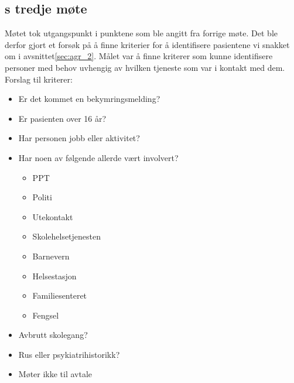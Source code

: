 \documentclass[11pt]{report} %
\begin{document}
                  \subsection{s tredje møte}\label{sec:agr_3}
                    Møtet tok utgangspunkt i punktene som ble angitt fra forrige møte\cite{arbgr_mref-2}. Det ble derfor gjort et forsøk på å finne kriterier for å identifisere pasientene vi snakket om i avsnittet\ref{sec:agr_2}. Målet var å finne kriterer som kunne identifisere personer med behov uvhengig av hvilken tjeneste som var i kontakt med dem. \\
                    Forslag til kriterer:\\
                      \begin{itemize}
                        \item Er det kommet en bekymringsmelding?\\
                        \item Er pasienten over 16 år?\\
                        \item Har personen jobb eller aktivitet?\\
                        \item Har noen av følgende allerde vært involvert?
                          \begin{itemize}
                            \item PPT\\
                            \item Politi\\
                            \item Utekontakt\\
                            \item Skolehelsetjenesten\\
                            \item Barnevern\\
                            \item Helsestasjon\\
                            \item Familiesenteret\\
                            \item Fengsel\\
                          \end{itemize}
                        \item Avbrutt skolegang?\\
                        \item Rus eller psykiatrihistorikk?\\
                        \item Møter ikke til avtale\\
                      \end{itemize}
\end{document}

